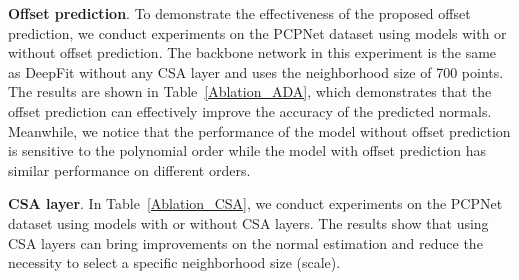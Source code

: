 \begin{table}[]
\begin{center}
    \vspace{-0.4cm}
\end{center}

\caption{Normal RMSE of models using thresholds to truncate points and the model with offset prediction on the PCPNet dataset. The first row shows the truncation thresholds.}
\vspace{-0.4cm}
\label{fig:truncate}
\end{table}


\textbf{Offset prediction}. To demonstrate the effectiveness of the proposed offset prediction, we conduct experiments on the PCPNet dataset using models with or without offset prediction. The backbone network in this experiment is the same as DeepFit without any CSA layer and uses the neighborhood size of 700 points. The results are shown in Table~\ref{Ablation_ADA}, which demonstrates that the offset prediction can effectively improve the accuracy of the predicted normals. Meanwhile, we notice that the performance of the model without offset prediction is sensitive to the polynomial order  while the model with offset prediction has similar performance on different orders.

\textbf{CSA layer}. In Table~\ref{Ablation_CSA}, we conduct experiments on the PCPNet dataset using models with or without CSA layers. The results show that using CSA layers can bring improvements on the normal estimation and reduce the necessity to select a specific neighborhood size (scale).

